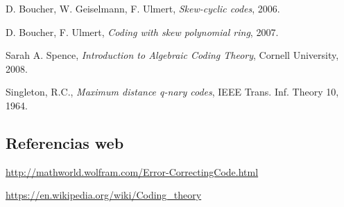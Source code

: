 \documentclass[a4paper,11pt]{article}
\numberwithin{equation}{section}
\theoremstyle{definition} %
\begin{document}

    \newpage

    \begin{thebibliography}{9}

        D. Boucher, W. Geiselmann, F. Ulmert,
        \emph{Skew-cyclic codes},
        2006.

        D. Boucher, F. Ulmert,
        \emph{Coding with skew polynomial ring},
        2007.

        Sarah A. Spence,
        \emph{Introduction to Algebraic Coding Theory},
        Cornell University,
        2008.

        Singleton, R.C.,
        \emph{Maximum distance q-nary codes},
        IEEE Trans. Inf. Theory 10,
        1964.

    \end{thebibliography}

    \subsection*{Referencias web}

    \url{http://mathworld.wolfram.com/Error-CorrectingCode.html}

    \url{https://en.wikipedia.org/wiki/Coding_theory}
\end{document}
